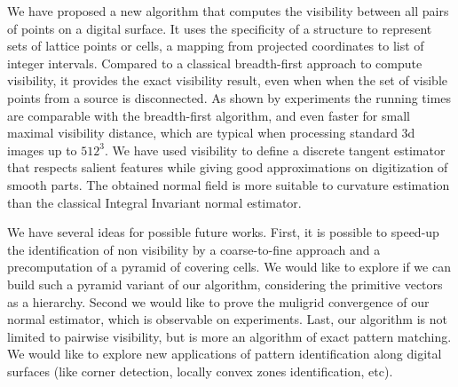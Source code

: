 We have proposed a new algorithm that computes the visibility between
all pairs of points on a digital surface. It uses the specificity of a
structure to represent sets of lattice points or cells, a mapping from
projected coordinates to list of integer intervals. Compared to a
classical breadth-first approach to compute visibility, it provides
the exact visibility result, even when when the set of visible points
from a source is disconnected. As shown by experiments the running
times are comparable with the breadth-first algorithm, and even faster
for small maximal visibility distance, which are typical when
processing standard 3d images up to $512^3$. We have used visibility
to define a discrete tangent estimator that respects salient features
while giving good approximations on digitization of smooth parts. The
obtained normal field is more suitable to curvature estimation than
the classical Integral Invariant normal estimator.

We have several ideas for possible future works. First, it is possible
to speed-up the identification of non visibility by a coarse-to-fine
approach and a precomputation of a pyramid of covering cells. We would
like to explore if we can build such a pyramid variant of our
algorithm, considering the primitive vectors as a hierarchy. Second we
would like to prove the muligrid convergence of our normal estimator,
which is observable on experiments. Last, our algorithm is not limited
to pairwise visibility, but is more an algorithm of exact pattern
matching. We would like to explore new applications of pattern
identification along digital surfaces (like corner detection, locally
convex zones identification, etc).
